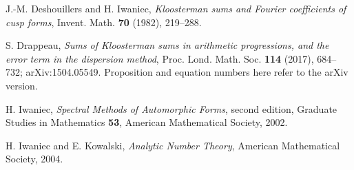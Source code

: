  J.-M. Deshouillers and H. Iwaniec,
\emph{Kloosterman sums and Fourier coefficients of cusp forms},
Invent. Math. \textbf{70} (1982), 219--288.

 S. Drappeau,
\emph{Sums of Kloosterman sums in arithmetic progressions, and the error term in the dispersion method},
Proc. Lond. Math. Soc. \textbf{114} (2017), 684--732;
arXiv:1504.05549. Proposition and equation numbers here refer to the arXiv version.

 H. Iwaniec,
\emph{Spectral Methods of Automorphic Forms}, second edition,
Graduate Studies in Mathematics \textbf{53}, American Mathematical Society, 2002.

 H. Iwaniec and E. Kowalski,
\emph{Analytic Number Theory}, American Mathematical Society, 2004.
